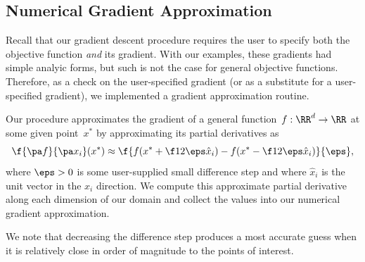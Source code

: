 \documentclass{article}
\begin{document}
\begin{multicols}{2}


\subsection{Numerical Gradient Approximation}
\label{subsec:grad-approx}

Recall that our gradient descent procedure requires the user to specify both the objective function \emph{and} its gradient. With our examples, these gradients had simple analyic forms, but such is not the case for general objective functions. Therefore, as a check on the user-specified gradient (or as a substitute for a user-specified gradient), we implemented a gradient approximation routine.

Our procedure approximates the gradient of a general function~$f:\RR^d\to\RR$ at some given point~$x^*$ by approximating its partial derivatives as
\begin{equation}
\label{eq:grad-approx}
\f{\pa f}{\pa x_i}(x^*) \approx \f{f(x^* + \f12\eps\hat x_i) - f(x^* - \f12 \eps\hat x_i)}{\eps},
\end{equation}
where $\eps > 0$ is some user-supplied small difference step and where $\hat x_i$ is the unit vector in the $x_i$ direction. We compute this approximate partial derivative along each dimension of our domain and collect the values into our numerical gradient approximation. 


We note that decreasing the difference step produces a most accurate guess when it is relatively close in order of magnitude to the points of interest.


\end{multicols}
\end{document}

